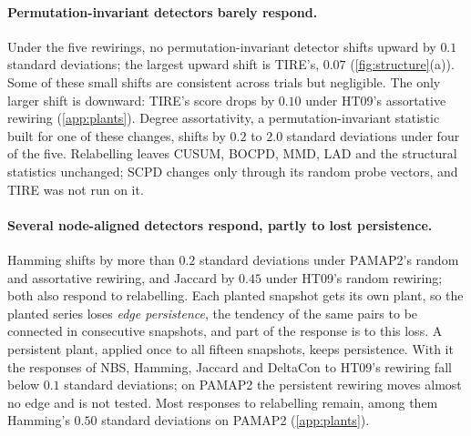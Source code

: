 \documentclass[11pt]{article}
\theoremstyle{dsplain}
\theoremstyle{definition}
\begin{document}
\paragraph{Permutation-invariant detectors barely respond.} Under the five rewirings, no
permutation-invariant detector shifts upward by $0.1$ standard deviations; the largest upward shift is
TIRE's, $0.07$ (\cref{fig:structure}(a)). Some of these small shifts are
consistent across trials but negligible. The only larger shift is downward: TIRE's score drops by $0.10$
under HT09's assortative rewiring
(\cref{app:plants}). Degree assortativity, a
permutation-invariant statistic built for one of these changes, shifts by $0.2$ to $2.0$ standard deviations
under four of the five. Relabelling leaves CUSUM, BOCPD, MMD, LAD and the structural statistics unchanged;
SCPD changes only through its random probe vectors, and TIRE was not run on it.

\paragraph{Several node-aligned detectors respond, partly to lost persistence.} Hamming shifts by more
than $0.2$ standard deviations under PAMAP2's random and assortative rewiring, and Jaccard by $0.45$ under
HT09's random rewiring; both also respond to relabelling. Each planted snapshot gets its own plant, so the
planted series loses \emph{edge persistence}, the tendency of the same pairs to be connected in
consecutive snapshots, and part of the response is to this loss. A persistent plant, applied once to all
fifteen snapshots, keeps persistence. With it the responses of NBS, Hamming, Jaccard and DeltaCon to HT09's
rewiring fall below $0.1$ standard deviations; on PAMAP2 the persistent rewiring moves almost no edge and
is not tested. Most responses to relabelling remain, among them Hamming's $0.50$ standard deviations
on PAMAP2 (\cref{app:plants}).
\end{document}
